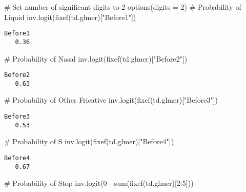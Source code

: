 \documentclass[
  10pt,
  letterpaper]{article}
\newenvironment{Shaded}{\begin{snugshade}}{\end{snugshade}}
\newcommand{\AttributeTok}[1]{\textcolor[rgb]{0.40,0.45,0.13}{#1}}
\newcommand{\CommentTok}[1]{\textcolor[rgb]{0.37,0.37,0.37}{#1}}
\newcommand{\DecValTok}[1]{\textcolor[rgb]{0.68,0.00,0.00}{#1}}
\newcommand{\FunctionTok}[1]{\textcolor[rgb]{0.28,0.35,0.67}{#1}}
\newcommand{\NormalTok}[1]{\textcolor[rgb]{0.00,0.23,0.31}{#1}}
\newcommand{\SpecialCharTok}[1]{\textcolor[rgb]{0.37,0.37,0.37}{#1}}
\newcommand{\StringTok}[1]{\textcolor[rgb]{0.13,0.47,0.30}{#1}}
\begin{document}
\begin{Shaded}
\begin{Highlighting}[]
\CommentTok{\# Set number of significant digits to 2}
\FunctionTok{options}\NormalTok{(}\AttributeTok{digits =} \DecValTok{2}\NormalTok{)}
\CommentTok{\# Probability of Liquid}
\FunctionTok{inv.logit}\NormalTok{(}\FunctionTok{fixef}\NormalTok{(td.glmer)[}\StringTok{"Before1"}\NormalTok{])}
\end{Highlighting}
\end{Shaded}

\begin{verbatim}
Before1 
   0.36 
\end{verbatim}

\begin{Shaded}
\begin{Highlighting}[]
\CommentTok{\# Probability of Nasal}
\FunctionTok{inv.logit}\NormalTok{(}\FunctionTok{fixef}\NormalTok{(td.glmer)[}\StringTok{"Before2"}\NormalTok{])}
\end{Highlighting}
\end{Shaded}

\begin{verbatim}
Before2 
   0.63 
\end{verbatim}

\begin{Shaded}
\begin{Highlighting}[]
\CommentTok{\# Probability of Other Fricative}
\FunctionTok{inv.logit}\NormalTok{(}\FunctionTok{fixef}\NormalTok{(td.glmer)[}\StringTok{"Before3"}\NormalTok{])}
\end{Highlighting}
\end{Shaded}

\begin{verbatim}
Before3 
   0.53 
\end{verbatim}

\begin{Shaded}
\begin{Highlighting}[]
\CommentTok{\# Probability of S}
\FunctionTok{inv.logit}\NormalTok{(}\FunctionTok{fixef}\NormalTok{(td.glmer)[}\StringTok{"Before4"}\NormalTok{])}
\end{Highlighting}
\end{Shaded}

\begin{verbatim}
Before4 
   0.67 
\end{verbatim}

\begin{Shaded}
\begin{Highlighting}[]
\CommentTok{\# Probability of Stop}
\FunctionTok{inv.logit}\NormalTok{(}\DecValTok{0} \SpecialCharTok{{-}} \FunctionTok{sum}\NormalTok{(}\FunctionTok{fixef}\NormalTok{(td.glmer)[}\DecValTok{2}\SpecialCharTok{:}\DecValTok{5}\NormalTok{]))}
\end{Highlighting}
\end{Shaded}
\end{document}
